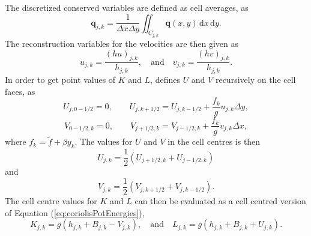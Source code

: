 \documentclass[11pt, a4paper]{article}
\newcommand{\drm}[0]{\,\mathrm{d}}
\newcommand{\vecq}[0]{\bm{q}}
\newcommand{\dx}[0]{\Delta x}
\newcommand{\dy}[0]{\Delta y}
\newcommand{\eastface}[1]{#1_{j + 1/2, k}}
\newcommand{\westface}[1]{#1_{j - 1/2, k}}
\newcommand{\northface}[1]{#1_{j, k + 1/2}}
\newcommand{\southface}[1]{#1_{j, k - 1/2}}
\newcommand{\eref}[1]{Equation (\ref{eq:#1})}
\begin{document}
The discretized conserved variables are defined as cell averages, as
\begin{equation}
	\vecq_{j,k} = \frac{1}{\dx \dy} \iint_{C_ {j,k}} \vecq(x, y) \drm x \drm y.
	\label{eq:cellAverage}
\end{equation}
The reconstruction variables for the velocities are then given as 
\begin{equation}
	u_{j,k} = \frac{(hu)_{j,k}}{h_{j,k}}, \quad \mathrm{and} \quad v_{j,k} = \frac{(hv)_{j,k}}{h_{j,k}}.
	\label{eq:uandv}
\end{equation}
In order to get point values of $K$ and $L$, \cite{CDKLM16} defines $U$ and $V$ recursively on the cell faces, as
\begin{equation}
	U_{j, 0-1/2} = 0, \qquad 
	\northface{U} = \southface{U} + \frac{f_k}{g}u_{j,k} \dy,
	\label{eq:recursiveU}
\end{equation}
\begin{equation}
	V_{0-1/2, k} = 0, \qquad 
	\eastface{V} = \westface{V} + \frac{f_k}{g}v_{j,k} \dx,
	\label{eq:recursiveV}
\end{equation}
where $f_k = \tilde{f} + \beta y_k$.
The values for $U$ and $V$ in the cell centres is then 
\begin{equation}
	U_{j,k} = \frac{1}{2} \left(\eastface{U} + \westface{U} \right)
	\label{eq:Um}
\end{equation}
and
\begin{equation}
	V_{j,k} = \frac{1}{2} \left(\northface{V} + \southface{V} \right).
	\label{eq:Vm}
\end{equation}
The cell centre values for $K$ and $L$ can then be evaluated as a cell centred version of \eref{coriolisPotEnergies},
\begin{equation}
	K_{j,k} = g \left(h_{j,k} + B_{j,k} - V_{j,k} \right), \quad \mathrm{and} \quad 
	L_{j,k} = g \left(h_{j,k} + B_{j,k} + U_{j,k} \right).
	\label{eq:KandL}
\end{equation}
\end{document}

